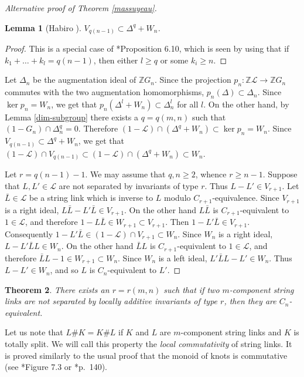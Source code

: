 \documentclass[a4paper,12pt,reqno,oneside]{amsart} %
\theoremstyle{plain}
\newtheorem{theorem}{Theorem}[section]
\newtheorem{lemma}[theorem]{Lemma}
\theoremstyle{definition}
\theoremstyle{named}
\renewcommand{\:}{\colon}
\def\Z{\mathbb{Z}}
\def\L{\mathcal{L}}
\begin{document}
\begin{proof}[Alternative proof of Theorem \ref{massuyeau}]
\begin{lemma}[Habiro \cite{Hab}] \label{habiro-main} $V_{q(n-1)}\subset\Delta^q+W_n$.
\end{lemma}

\begin{proof} This is a special case of \cite{Hab}*{Proposition 6.10}, which is seen by using that if $k_1+\dots+k_l=q(n-1)$, 
then either $l\ge q$ or some $k_i\ge n$.
\end{proof}

Let $\Delta_n$ be the augmentation ideal of $\Z G_n$.
Since the projection $p_n\:\Z\L\to\Z G_n$ commutes with the two augmentation homomorphisms, $p_n(\Delta)\subset\Delta_n$.
Since $\ker p_n=W_n$, we get that $p_n(\Delta^l+W_n)\subset\Delta_n^l$ for all $l$.
On the other hand, by Lemma \ref{dim-subgroup} there exists a $q=q(m,n)$ such that $(1-G_n)\cap\Delta_n^q=0$.
Therefore $(1-\L)\cap (\Delta^q+W_n)\subset\ker p_n=W_n$.
Since $V_{q(n-1)}\subset\Delta^q+W_n$, we get that $(1-\L)\cap V_{q(n-1)}\subset(1-\L)\cap(\Delta^q+W_n)\subset W_n$.

Let $r=q(n-1)-1$.
We may assume that $q,n\ge 2$, whence $r\ge n-1$.
Suppose that $L,L'\in\L$ are not separated by invariants of type $r$.
Thus $L-L'\in V_{r+1}$.
Let $\bar L\in\L$ be a string link which is inverse to $L$ modulo $C_{r+1}$-equivalence.
Since $V_{r+1}$ is a right ideal, $L\bar L-L'\bar L\in V_{r+1}$.
On the other hand $L\bar L$ is $C_{r+1}$-equivalent to $1\in\L$, and therefore $1-L\bar L\in W_{r+1}\subset V_{r+1}$.
Then $1-L'\bar L\in V_{r+1}$.
Consequently $1-L'\bar L\in (1-\L)\cap V_{r+1}\subset W_n$.
Since $W_n$ is a right ideal, $L-L'\bar LL\in W_n$.
On the other hand $\bar LL$ is $C_{r+1}$-equivalent to $1\in\L$, and therefore $\bar LL-1\in W_{r+1}\subset W_n$.
Since $W_n$ is a left ideal, $L'\bar LL-L'\in W_n$.
Thus $L-L'\in W_n$, and so $L$ is $C_n$-equivalent to $L'$.
\end{proof}

\begin{theorem} \label{locally-additive} There exists an $r=r(m,n)$ such that if two $m$-component string links are not separated
by locally additive invariants of type $r$, then they are $C_n$-equivalent.
\end{theorem}

Let us note that $L\# K=K\# L$ if $K$ and $L$ are $m$-component string links and $K$ is totally split.
We will call this property the {\it local commutativity} of string links.
It is proved similarly to the usual proof that the monoid of knots is commutative (see \cite{BZ}*{Figure 7.3} or \cite{Fox-qt}*{p.\ 140}).
\end{document}

